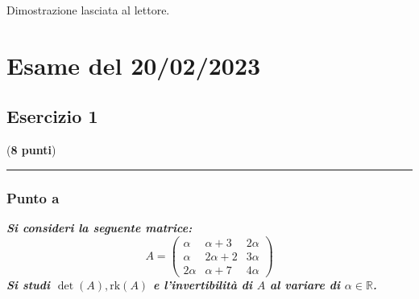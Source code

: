 \documentclass[a4paper]{article}
\newcommand{\longline}{\noindent\rule{\textwidth}{0.4pt}}
\begin{document}
	\noindent
	Dimostrazione lasciata al lettore.\newpage

	\section{Esame del 20/02/2023}

	\subsection{Esercizio 1}

	(\textbf{8 punti})\newline

	\longline

	\subsubsection{Punto a}

	\textcolor{Green4}{\textbf{\emph{Si consideri la seguente matrice:}}
	\begin{equation*}
		A = \begin{pmatrix}
			\alpha	& \alpha+3	& 2\alpha	\\
			\alpha	& 2\alpha+2	& 3\alpha	\\
			2\alpha	& \alpha+7	& 4\alpha	
		\end{pmatrix}
	\end{equation*}
	\textbf{\emph{Si studi $\det\left(A\right), \mathrm{rk}\left(A\right)$ e l'invertibilità di $A$ al variare di $\alpha \in \mathbb{R}$.}}}\newline
\end{document}
